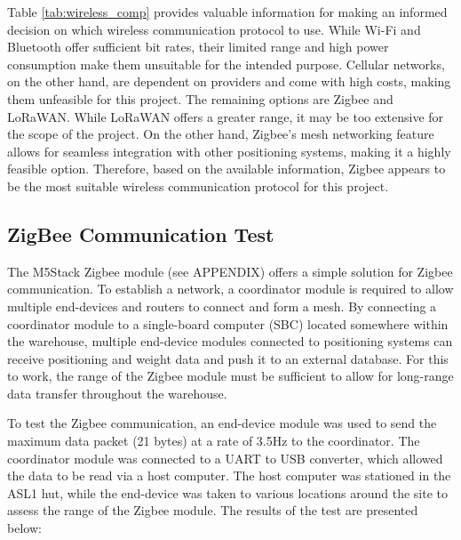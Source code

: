 \documentclass[12pt, a4paper]{article}
\begin{document}
Table \ref{tab:wireless_comp} provides valuable information for making an informed decision on which wireless communication protocol to use. 
While Wi-Fi and Bluetooth offer sufficient bit rates, their limited range and high power consumption make them unsuitable for the intended purpose. 
Cellular networks, on the other hand, are dependent on providers and come with high costs, making them unfeasible for this project. 
The remaining options are Zigbee and LoRaWAN. While LoRaWAN offers a greater range, it may be too extensive for the scope of the project. 
On the other hand, Zigbee's mesh networking feature allows for seamless integration with other positioning systems, making it a highly feasible option. 
Therefore, based on the available information, Zigbee appears to be the most suitable wireless communication protocol for this project.
\subsection{ZigBee Communication Test}

The M5Stack Zigbee module (see APPENDIX) offers a simple solution for Zigbee communication. 
To establish a network, a coordinator module is required to allow multiple end-devices and routers to connect and form a mesh. 
By connecting a coordinator module to a single-board computer (SBC) located somewhere within the warehouse, multiple end-device modules connected 
to positioning systems can receive positioning and weight data and push it to an external database. 
For this to work, the range of the Zigbee module must be sufficient to allow for long-range data transfer throughout the warehouse.

To test the Zigbee communication, an end-device module was used to send the maximum data packet (21 bytes) at a rate of 3.5Hz to the coordinator. 
The coordinator module was connected to a UART to USB converter, which allowed the data to be read via a host computer. 
The host computer was stationed in the ASL1 hut, while the end-device was taken to various locations around the site to assess the range of the Zigbee module. 
The results of the test are presented below:
\end{document}
